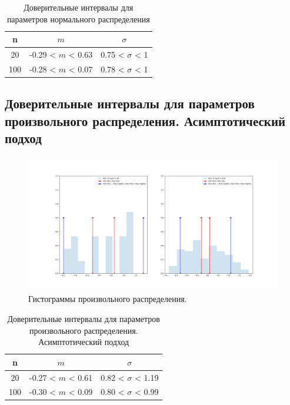 \documentclass[../main.tex]{subfiles}
\begin{document}
	\begin{table}[H]
	    \centering
	    \begin{tabular}{| c | c | c |}
	    \hline
	       n    &  $m$  & $\sigma$\\ \hline
	        20  &  -0.29 < $m$ < 0.63 & 0.75 < $\sigma$ < 1 \\ \hline
	       100   & -0.28 < $m$ < 0.07 & 0.78 < $\sigma$ < 1 \\
	   \hline
	    \end{tabular}
	    \caption{Доверительные интервалы для параметров нормального распределения}
	    \label{tab:interv_simple}
	\end{table}
	
\subsection{Доверительные интервалы для параметров произвольного распределения. Асимптотический подход}
    \begin{figure}[H]
		\centering
			\includegraphics[width = 20cm, height = 6cm]{figures/2.png}
		\caption{Гистограммы произвольного распределения.}
		\label{w_pert}
	\end{figure}
	\begin{table}[H]
	    \centering
	    \begin{tabular}{| c | c | c |}
	    \hline
	       n    &  $m$  & $\sigma$\\ \hline
	        20  &  -0.27 < $m$ < 0.61 & 0.82 < $\sigma$ < 1.19 \\ \hline
	       100   &  -0.30 < $m$ < 0.09 & 0.80 < $\sigma$ < 0.99 \\
	   \hline
	    \end{tabular}
	    \caption{Доверительные интервалы для параметров произвольного распределения. Асимптотический подход}
	    \label{tab:interv_asimpt}
	\end{table}
\end{document}
